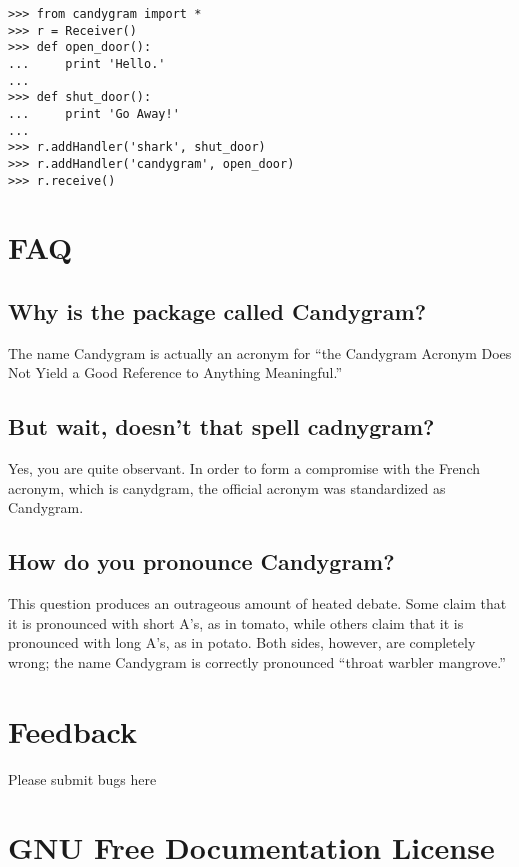 \documentclass{howto}
\begin{document}
\begin{verbatim}
>>> from candygram import *
>>> r = Receiver()
>>> def open_door():
...     print 'Hello.'
...
>>> def shut_door():
...     print 'Go Away!'
...
>>> r.addHandler('shark', shut_door)
>>> r.addHandler('candygram', open_door)
>>> r.receive()
\end{verbatim}


\section{FAQ}


\subsection{Why is the package called Candygram?}
The name Candygram is actually an acronym for ``the Candygram Acronym Does Not
Yield a Good Reference to Anything Meaningful.''

\subsection{But wait, doesn't that spell {\sc cadnygram}?}
Yes, you are quite observant. In order to form a compromise with the French
acronym, which is {\sc canydgram}, the official acronym was standardized as
{\sc Candygram}.

\subsection{How do you pronounce Candygram?}
This question produces an outrageous amount of heated debate. Some claim that
it is pronounced with short A's, as in tomato, while others claim that it is
pronounced with long A's, as in potato. Both sides, however, are completely
wrong; the name Candygram is correctly pronounced ``throat warbler mangrove.''



\section{Feedback}

Please submit bugs here



\appendix
\section{GNU Free Documentation License}
\label{fdl}





\end{document}
